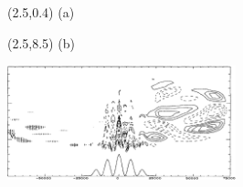 \documentclass{article}
\begin{document}
\begin{textblock}{1}(2.5,0.4)
\normalsize
(a)
\end{textblock}
\begin{textblock}{1}(2.5,8.5)
\normalsize
(b)
\end{textblock}
\hspace{0.35in}\includegraphics[width=2.6in,height=1.32in]{img/schaer-btf-4thorder-error.png}

\footnotesize

\end{document}
